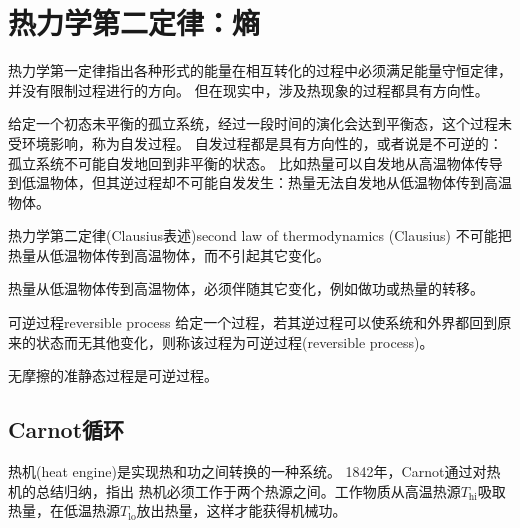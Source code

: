 \section{热力学第二定律：熵}

热力学第一定律指出各种形式的能量在相互转化的过程中必须满足能量守恒定律，并没有限制过程进行的方向。
但在现实中，涉及热现象的过程都具有方向性。

给定一个初态未平衡的孤立系统，经过一段时间的演化会达到平衡态，这个过程未受环境影响，称为自发过程。
自发过程都是具有方向性的，或者说是不可逆的：
孤立系统不可能自发地回到非平衡的状态。
比如热量可以自发地从高温物体传导到低温物体，但其逆过程却不可能自发发生：热量无法自发地从低温物体传到高温物体。

\begin{theorem}
	{热力学第二定律(Clausius表述)}{second law of thermodynamics (Clausius)}
	不可能把热量从低温物体传到高温物体，而不引起其它变化。
\end{theorem}

\begin{corollary}
	热量从低温物体传到高温物体，必须伴随其它变化，例如做功或热量的转移。
\end{corollary}

\begin{definition}
	{可逆过程}{reversible process}
	给定一个过程，若其逆过程可以使系统和外界都回到原来的状态而无其他变化，则称该过程为可逆过程(reversible process)。
\end{definition}

\begin{corollary}
	无摩擦的准静态过程是可逆过程。
\end{corollary}

\subsection{Carnot循环}

\newcommand{\hi}{_{\mathrm{hi}}}
\newcommand{\lo}{_{\mathrm{lo}}}

热机(heat engine)是实现热和功之间转换的一种系统。
1842年，Carnot通过对热机的总结归纳，指出
热机必须工作于两个热源之间。工作物质从高温热源$T\hi$吸取热量，在低温热源$T\lo$放出热量，这样才能获得机械功。


